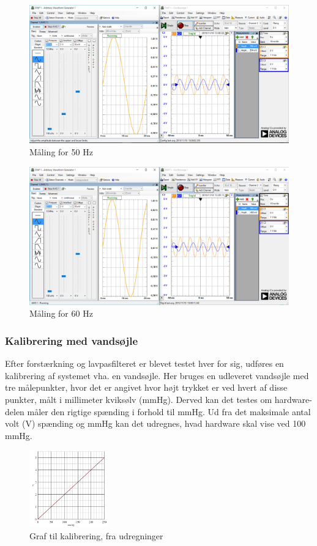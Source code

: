 \begin{figure}[H]
	\centering
	\includegraphics[width=1.0\textwidth]{Figurer/50Hz}
	\caption{Måling for 50 Hz}
	\label{fig:maeling50Hz}
\end{figure}

\begin{figure}[H]
	\centering
	\includegraphics[width=1.0\textwidth]{Figurer/60Hz}
	\caption{Måling for 60 Hz}
	\label{fig:maeling60Hz}
\end{figure}

\subsubsection{Kalibrering med vandsøjle}
Efter forstærkning og lavpasfilteret er blevet testet hver for sig, udføres en kalibrering af systemet vha. en vandsøjle. Her bruges en udleveret vandsøjle med tre målepunkter, hvor det er angivet hvor højt trykket er ved hvert af disse punkter, målt i millimeter kviksølv (mmHg). Derved kan det testes om hardware-delen måler den rigtige spænding i forhold til mmHg. Ud fra det maksimale antal volt (V) spænding og mmHg kan det udregnes, hvad hardware skal vise ved 100 mmHg. 
\begin{figure}[H]
	\centering
	\includegraphics[width=0.3\textwidth]{Figurer/graf_vandtest}
	\caption{Graf til kalibrering, fra udregninger}
	\label{fig:graf_vandtest}
\end{figure}

